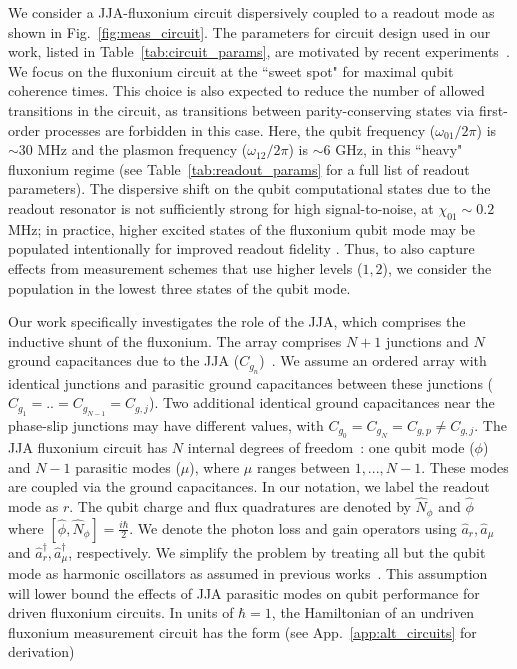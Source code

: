 \documentclass[%
reprint,
superscriptaddress,
 amsmath,amssymb,
 aps,
 prx,
longbibliography,
floatfix,
]{revtex4-2}
\begin{document}
We consider a JJA-fluxonium circuit dispersively coupled to a readout mode as shown in Fig.~\ref{fig:meas_circuit}. The parameters for circuit design used in our work, listed in Table~\ref{tab:circuit_params}, are motivated by recent experiments~\cite{zhang_tunable_2024,zhang_universal_2021}. We focus on the fluxonium circuit at the ``sweet spot" for maximal qubit coherence times. This choice is also expected to reduce the number of allowed transitions in the circuit, as transitions between parity-conserving states via first-order processes are forbidden in this case. Here, the qubit frequency ($\omega_{01}/2\pi$) is $\sim 30$ MHz and the plasmon frequency ($\omega_{12}/2\pi$) is $\sim 6$ GHz, in this ``heavy" fluxonium regime (see Table~\ref{tab:readout_params} for a full list of readout parameters). The dispersive shift on the qubit computational states due to the readout resonator is not sufficiently strong for high signal-to-noise, at $\chi_{01} \sim 0.2$ MHz; in practice, higher excited states of the fluxonium qubit mode may be populated intentionally for improved readout fidelity \cite{zhang_universal_2021}. Thus, to also capture effects from measurement schemes that use higher levels ($1,2$), we consider the population in the lowest three states of the qubit mode. 

Our work specifically investigates the role of the JJA, which comprises the inductive shunt of the fluxonium. The array comprises $N+1$ junctions and $N$ ground capacitances due to the JJA ($C_{g_n}$)~\cite{manucharyan2009fluxonium}. We assume an ordered array with identical junctions and parasitic ground capacitances between these junctions ($C_{g_1}=..=C_{g_{N-1}}=C_{g,j}$). Two additional identical ground capacitances near the phase-slip junctions may have different values, with $C_{g_0}=C_{g_N}=C_{g,p}\neq C_{g, j}$. The JJA fluxonium circuit has $N$ internal degrees of freedom~\cite{ferguson2013symmetries,viola2015collective}: one qubit mode ($\phi$) and $N-1$ parasitic modes ($\mu$), where $\mu$ ranges between $1,...,N-1$. These  modes are coupled via the ground capacitances. 
In our notation, we label the readout mode as $r$. The qubit charge and flux quadratures are denoted by $\hat N_\phi$ and $\hat \phi$ where $[\hat \phi,\hat N_\phi]=\frac{i\hbar}{2}$. We denote the photon loss and gain operators using $\hat a_r,\hat a_\mu$ and $\hat a_r^\dagger,\hat a_\mu^\dagger$, respectively. We simplify the problem by treating all but the qubit mode as harmonic oscillators as assumed in previous works~\cite{ferguson2013symmetries,viola2015collective,dumas2024unified}. This assumption will lower bound the effects of JJA parasitic modes on qubit performance for driven fluxonium circuits. In units of $\hbar=1$, the Hamiltonian of an undriven fluxonium measurement circuit has the form (see App.~\ref{app:alt_circuits} for derivation)
\end{document}
